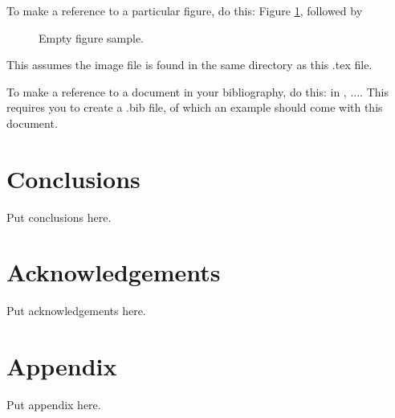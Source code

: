 \documentclass[twocolumn, letterpaper]{article}
\begin{document}
To make a reference to a particular figure, do this: Figure \ref{fig:sample}, followed by 
\begin{figure}
    \caption{Empty figure sample.}
    \label{fig:sample}
\end{figure}
This assumes the image file is found in the same directory as this .tex file.

To make a reference to a document in your bibliography, do this: in \cite{textbook}, ....
This requires you to create a .bib file, of which an example should come with this document.

\section*{Conclusions}
Put conclusions here.

\section*{Acknowledgements}
Put acknowledgements here.

\printbibliography

\section*{Appendix}
Put appendix here.
\end{document}
